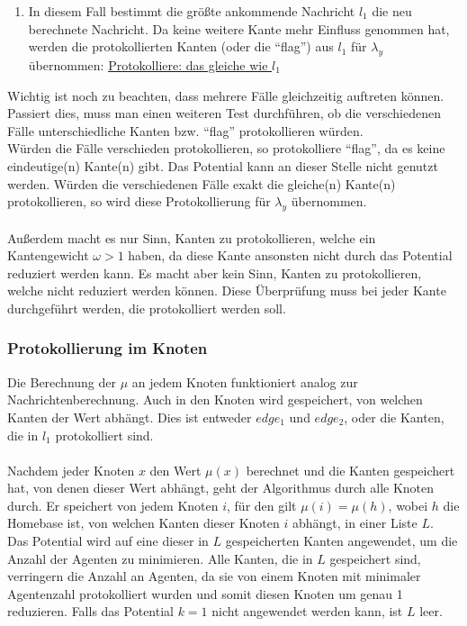 \begin{enumerate}[label=\alph*)]
	\item In diesem Fall bestimmt die größte ankommende Nachricht $l_{1}$ die neu berechnete Nachricht. Da keine weitere Kante mehr Einfluss genommen hat, werden die protokollierten Kanten (oder die "`flag"') aus $l_{1}$ für $\lambda_{y}$ übernommen: \uline{Protokolliere: das gleiche wie $l_{1}$}
	
\end{enumerate}
Wichtig ist noch zu beachten, dass mehrere Fälle gleichzeitig auftreten können. Passiert dies, muss man einen weiteren Test durchführen, ob die verschiedenen Fälle unterschiedliche Kanten bzw. "`flag"' protokollieren würden.
\\
Würden die Fälle verschieden protokollieren, so protokolliere "`flag"', da es keine eindeutige(n) Kante(n) gibt. Das Potential kann an dieser Stelle nicht genutzt werden. Würden die verschiedenen Fälle exakt die gleiche(n) Kante(n) protokollieren, so wird diese Protokollierung für $\lambda_{y}$ übernommen.
\\
\\
Außerdem macht es nur Sinn, Kanten zu protokollieren, welche ein Kantengewicht $\omega > 1$ haben, da diese Kante ansonsten nicht durch das Potential reduziert werden kann. Es macht aber kein Sinn, Kanten zu protokollieren, welche nicht reduziert werden können. Diese Überprüfung muss bei jeder Kante durchgeführt werden, die protokolliert werden soll.

\subsubsection{Protokollierung im Knoten}

Die Berechnung der $\mu$ an jedem Knoten funktioniert analog zur Nachrichtenberechnung. Auch in den Knoten wird gespeichert, von welchen Kanten der Wert abhängt. Dies ist entweder $edge_{1}$ und $edge_{2}$, oder die Kanten, die in $l_{1}$ protokolliert sind.
\\
\\
Nachdem jeder Knoten $x$ den Wert $\mu(x)$ berechnet und die Kanten gespeichert hat, von denen dieser Wert abhängt, geht der Algorithmus durch alle Knoten durch. Er speichert von jedem Knoten $i$, für den gilt $\mu(i) = \mu(h)$, wobei $h$ die Homebase ist, von welchen Kanten dieser Knoten $i$ abhängt, in einer Liste $L$. \\
Das Potential wird auf eine dieser in $L$ gespeicherten Kanten angewendet, um die Anzahl der Agenten zu minimieren. Alle Kanten, die in $L$ gespeichert sind, verringern die Anzahl an Agenten, da sie von einem Knoten mit minimaler Agentenzahl protokolliert wurden und somit diesen Knoten um genau 1 reduzieren. Falls das Potential $k = 1$ nicht angewendet werden kann, ist $L$ leer.

